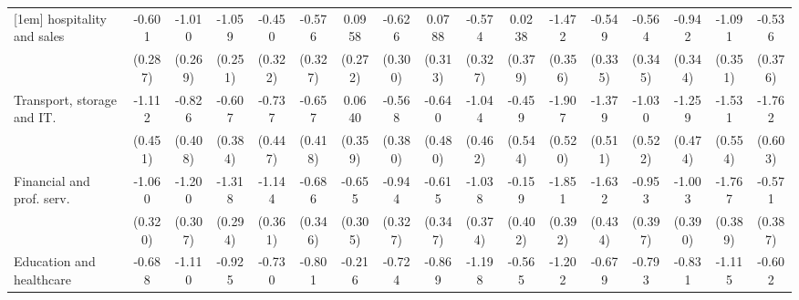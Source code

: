 {\begin{tabular}{l*{16}{c}}
[1em]
hospitality and sales&      -0.601\sym{*}  &      -1.010\sym{***}&      -1.059\sym{***}&      -0.450         &      -0.576         &      0.0958         &      -0.626\sym{*}  &      0.0788         &      -0.574         &      0.0238         &      -1.472\sym{***}&      -0.549         &      -0.564         &      -0.942\sym{**} &      -1.091\sym{**} &      -0.536         \\
                    &     (0.287)         &     (0.269)         &     (0.251)         &     (0.322)         &     (0.327)         &     (0.272)         &     (0.300)         &     (0.313)         &     (0.327)         &     (0.379)         &     (0.356)         &     (0.335)         &     (0.345)         &     (0.344)         &     (0.351)         &     (0.376)         \\
[1em]
Transport, storage and IT.&      -1.112\sym{*}  &      -0.826\sym{*}  &      -0.607         &      -0.737         &      -0.657         &      0.0640         &      -0.568         &      -0.640         &      -1.044\sym{*}  &      -0.459         &      -1.907\sym{***}&      -1.379\sym{**} &      -1.030\sym{*}  &      -1.259\sym{**} &      -1.531\sym{**} &      -1.762\sym{**} \\
                    &     (0.451)         &     (0.408)         &     (0.384)         &     (0.447)         &     (0.418)         &     (0.359)         &     (0.380)         &     (0.480)         &     (0.462)         &     (0.544)         &     (0.520)         &     (0.511)         &     (0.522)         &     (0.474)         &     (0.554)         &     (0.603)         \\
[1em]
Financial and prof. serv.&      -1.060\sym{***}&      -1.200\sym{***}&      -1.318\sym{***}&      -1.144\sym{**} &      -0.686\sym{*}  &      -0.655\sym{*}  &      -0.944\sym{**} &      -0.615         &      -1.038\sym{**} &      -0.159         &      -1.851\sym{***}&      -1.632\sym{***}&      -0.953\sym{*}  &      -1.003\sym{*}  &      -1.767\sym{***}&      -0.571         \\
                    &     (0.320)         &     (0.307)         &     (0.294)         &     (0.361)         &     (0.346)         &     (0.305)         &     (0.327)         &     (0.347)         &     (0.374)         &     (0.402)         &     (0.392)         &     (0.434)         &     (0.397)         &     (0.390)         &     (0.389)         &     (0.387)         \\
[1em]
Education and healthcare&      -0.688\sym{*}  &      -1.110\sym{***}&      -0.925\sym{***}&      -0.730\sym{*}  &      -0.801\sym{*}  &      -0.216         &      -0.724\sym{*}  &      -0.869\sym{*}  &      -1.198\sym{***}&      -0.565         &      -1.202\sym{***}&      -0.679         &      -0.793\sym{*}  &      -0.831\sym{*}  &      -1.115\sym{**} &      -0.602         \\

\end{tabular}}
